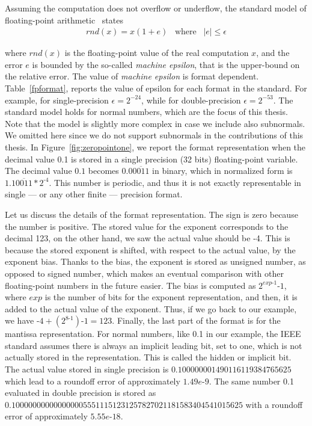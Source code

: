 Assuming the computation does not overflow or underflow, the standard model of floating-point arithmetic~\cite{every} states
%
\begin{align}
rnd(x)=x(1+e)\;\;\;\text{where}\;\;\;|e|\leq\epsilon
\label{standard}
\end{align}
%

where $rnd(x)$ is the floating-point value of the real computation $x$, and the error $e$ is bounded by the so-called \emph{machine epsilon}, that is the upper-bound on the relative error.
%
The value of \emph{machine epsilon} is format dependent.
%
Table~\ref{fpformat}, reports the value of epsilon for each format in the standard.
%
For example, for single-precision $\epsilon=2^{-24}$, while for double-precision $\epsilon=2^{-53}$.
%
The standard model holds for normal numbers, which are the focus of this thesis.
%
Note that the model is slightly more complex in case we include also subnormals.
%
We omitted here since we do not support subnormals in the contributions of this thesis.
%
In Figure~\ref{fig:zeropointone}, we report the format representation when the decimal value 0.1 is stored in a single precision (32 bits) floating-point variable.
%
The decimal value $0.1$ becomes $0.0\overline{0011}$ in binary, which in normalized form is $1.1\overline{0011}*2^{\text{-}4}$.
%
This number is periodic, and thus it is not exactly representable in single --- or any other finite --- precision format.
%

Let us discuss the details of the format representation.
%
The sign is zero because the number is positive.
%
The stored value for the exponent corresponds to the decimal 123, on the other hand, we saw the actual value should be -4.
%
This is because the stored exponent is shifted, with respect to the actual value, by the exponent bias. 
%
Thanks to the bias, the exponent is stored as unsigned number, as opposed to signed number, which makes an eventual comparison with other floating-point numbers in the future easier.
%
The bias is computed as $2^{exp\text{-}1}\text{-}1$, where $exp$ is the number of bits for the exponent representation, and then, it is added to the actual value of the exponent.
%
Thus, if we go back to our example, we have $\text{-}4+(2^{8\text{-}1})\text{-}1=123$.
%
Finally, the last part of the format is for the mantissa representation. 
%
For normal numbers, like 0.1 in our example, the IEEE standard assumes there is always an implicit leading bit, set to one, which is not actually stored in the representation.
%
%
This is called the hidden or implicit bit.
%
The actual value stored in single precision is $0.100000001490116119384765625$ which lead to a roundoff error of approximately $1.49e\text{-}9$.
%
The same number 0.1 evaluated in double precision is stored as \\ $0.1000000000000000055511151231257827021181583404541015625$ with a roundoff error of approximately $5.55e\text{-}18$.
%
